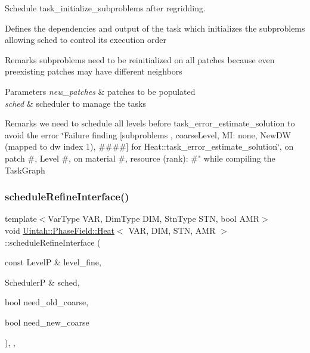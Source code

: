 Schedule task\+\_\+initialize\+\_\+subproblems after regridding. 

Defines the dependencies and output of the task which initializes the subproblems allowing sched to control its execution order

\begin{DoxyRemark}{Remarks}
subproblems need to be reinitialized on all patches because even preexisting patches may have different neighbors
\end{DoxyRemark}

\begin{DoxyParams}{Parameters}
{\em new\+\_\+patches} & patches to be populated \\
\hline
{\em sched} & scheduler to manage the tasks\\
\hline
\end{DoxyParams}
\begin{DoxyRemark}{Remarks}
we need to schedule all levels before task\+\_\+error\+\_\+estimate\+\_\+solution to avoid the error \char`\"{}\+Failure finding \mbox{[}subproblems , coarse\+Level, M\+I\+: none, New\+D\+W
(mapped to dw index 1), \#\#\#\#\mbox{]} for Heat\+::task\+\_\+error\+\_\+estimate\+\_\+solution\char`\"{}, on patch \#, Level \#, on material \#, resource (rank)\+: \#" while compiling the Task\+Graph 
\end{DoxyRemark}
\mbox{\label{classUintah_1_1PhaseField_1_1Heat_a0897d2ac6114e763ec9d832100824faf}} 
\subsubsection{\texorpdfstring{schedule\+Refine\+Interface()}{scheduleRefineInterface()}}
{\footnotesize\ttfamily template$<$Var\+Type V\+AR, Dim\+Type D\+IM, Stn\+Type S\+TN, bool A\+MR$>$ \\
void \hyperlink{classUintah_1_1PhaseField_1_1Heat}{Uintah\+::\+Phase\+Field\+::\+Heat}$<$ V\+AR, D\+IM, S\+TN, A\+MR $>$\+::schedule\+Refine\+Interface (\begin{DoxyParamCaption}\item[{const LevelP \&}]{level\+\_\+fine,  }\item[{SchedulerP \&}]{sched,  }\item[{bool}]{need\+\_\+old\+\_\+coarse,  }\item[{bool}]{need\+\_\+new\+\_\+coarse }\end{DoxyParamCaption})\hspace{0.3cm}{\ttfamily [override]}, {\ttfamily [protected]}, {\ttfamily [virtual]}}



